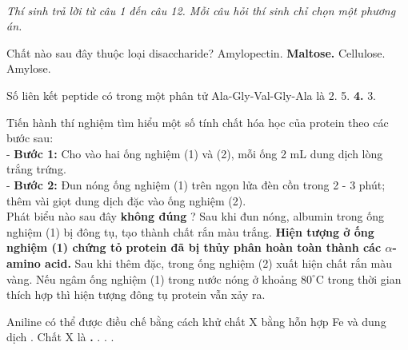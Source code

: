 \documentclass[11pt,a4paper]{article}
\begin{document}
 \\
\textit{Thí sinh trả lời từ câu 1 đến câu 12. Mỗi câu hỏi thí sinh chỉ chọn một phương án.}
\vspace{4pt}
\begin{ex}
Chất nào sau đây thuộc loại disaccharide?
\choice
{Amylopectin.}
{\textbf{\color{hfRed}Maltose.}}
{Cellulose.}
{Amylose.}
\end{ex}
\begin{ex}
Số liên kết peptide có trong một phân tử Ala-Gly-Val-Gly-Ala là
\choice
{2.}
{5.}
{\textbf{\color{hfRed}4.}}
{3.}
\end{ex}
\begin{ex}
Tiến hành thí nghiệm tìm hiểu một số tính chất hóa học của protein theo các bước sau:\\- \textbf{Bước 1:} Cho vào hai ống nghiệm (1) và (2), mỗi ống 2 mL dung dịch lòng trắng trứng.\\- \textbf{Bước 2:} Đun nóng ống nghiệm (1) trên ngọn lửa đèn cồn trong 2 - 3 phút; thêm vài giọt dung dịch  đặc vào ống nghiệm (2).\\Phát biểu nào sau đây \textbf{không đúng} ?
\choice
{Sau khi đun nóng, albumin trong ống nghiệm (1) bị đông tụ, tạo thành chất rắn màu trắng.}
{\textbf{\color{hfRed}Hiện tượng ở ống nghiệm (1) chứng tỏ protein đã bị thủy phân hoàn toàn thành các $\alpha$-amino acid.}}
{Sau khi thêm  đặc, trong ống nghiệm (2) xuất hiện chất rắn màu vàng.}
{Nếu ngâm ống nghiệm (1) trong nước nóng ở khoảng $80^\circ\text{C}$ trong thời gian thích hợp thì hiện tượng đông tụ protein vẫn xảy ra.}
\end{ex}
\begin{ex}
Aniline có thể được điều chế bằng cách khử chất X bằng hỗn hợp Fe và dung dịch . Chất X là
\choice
{\textbf{\color{hfRed}.}}
{.}
{.}
{.}
\end{ex}
\end{document}
